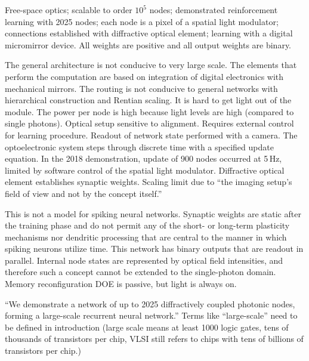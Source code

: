 \vspace{3em}
\cite{jaha2004}

\vspace{3em}
\cite{brfi2015}

\vspace{3em}
\cite{buma2018}
Free-space optics; scalable to order $10^5$ nodes; demonstrated reinforcement learning with 2025 nodes; each node is a pixel of a spatial light modulator; connections established with diffractive optical element; learning with a digital micromirror device. All weights are positive and all output weights are binary.

The general architecture is not conducive to very large scale. The elements that perform the computation are based on integration of digital electronics with mechanical mirrors. The routing is not conducive to general networks with hierarchical construction and Rentian scaling. It is hard to get light out of the module. The power per node is high because light levels are high (compared to single photons). Optical setup sensitive to alignment. Requires external control for learning procedure. Readout of network state performed with a camera. The optoelectronic system steps through discrete time with a specified update equation. In the 2018 demonstration, update of 900 nodes occurred at 5\,Hz, limited by software control of the spatial light modulator. Diffractive optical element establishes synaptic weights. Scaling limit due to ``the imaging setup's field of view and not by the concept itself.''

This is not a model for spiking neural networks. Synaptic weights are static after the training phase and do not permit any of the short- or long-term plasticity mechanisms nor dendritic processing that are central to the manner in which spiking neurons utilize time. This network has binary outputs that are readout in parallel. Internal node states are represented by optical field intensities, and therefore such a concept cannot be extended to the single-photon domain. Memory reconfiguration DOE is passive, but light is always on.

``We demonstrate a network of up to 2025 diffractively coupled photonic nodes, forming a large-scale recurrent neural network.'' Terms like ``large-scale'' need to be defined in introduction (large scale means at least 1000 logic gates, tens of thousands of transistors per chip, VLSI still refers to chips with tens of billions of transistors per chip.)

